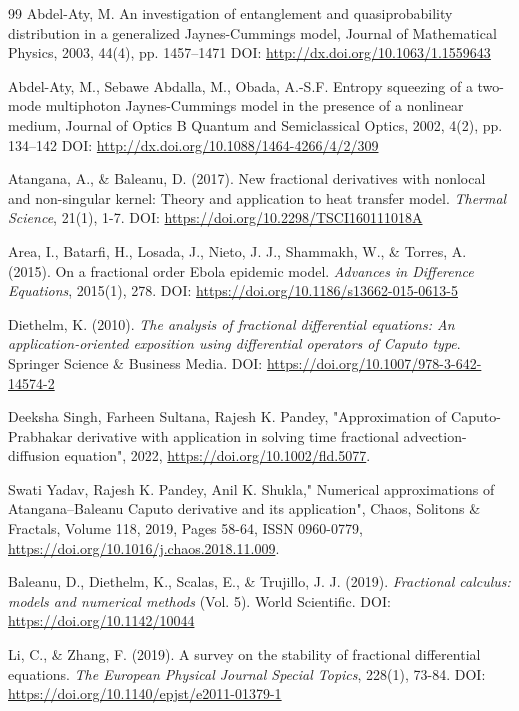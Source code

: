 \documentclass[10pt]{NSP1}
\begin{document}
\begin{thebibliography}{99}
 Abdel-Aty, M.
An investigation of entanglement and quasiprobability distribution in a generalized Jaynes-Cummings model, Journal of Mathematical Physics, 2003, 44(4), pp. 1457--1471 DOI: \url{http://dx.doi.org/10.1063/1.1559643}

 Abdel-Aty, M., Sebawe Abdalla, M., Obada, A.-S.F.
Entropy squeezing of a two-mode multiphoton Jaynes-Cummings model in the presence of a nonlinear medium, Journal of Optics B Quantum and Semiclassical Optics, 2002, 4(2), pp. 134--142 DOI: \url{http://dx.doi.org/10.1088/1464-4266/4/2/309}

Atangana, A., \& Baleanu, D. (2017). New fractional derivatives with nonlocal and non-singular kernel: Theory and application to heat transfer model. \emph{Thermal Science}, 21(1), 1-7. DOI: \url{https://doi.org/10.2298/TSCI160111018A}

Area, I., Batarfi, H., Losada, J., Nieto, J. J., Shammakh, W., \& Torres, A. (2015). On a fractional order Ebola epidemic model. \emph{Advances in Difference Equations}, 2015(1), 278. DOI: \url{https://doi.org/10.1186/s13662-015-0613-5}

Diethelm, K. (2010). \emph{The analysis of fractional differential equations: An application-oriented exposition using differential operators of Caputo type}. Springer Science \& Business Media. DOI: \url{https://doi.org/10.1007/978-3-642-14574-2}

Deeksha Singh, Farheen Sultana, Rajesh K. Pandey, "Approximation of Caputo-Prabhakar derivative with application in solving time fractional advection-diffusion equation", 2022, \url{https://doi.org/10.1002/fld.5077}.

Swati Yadav, Rajesh K. Pandey, Anil K. Shukla," Numerical approximations of Atangana--Baleanu Caputo derivative and its application", Chaos, Solitons \& Fractals, Volume 118, 2019, Pages 58-64, ISSN 0960-0779, \url{https://doi.org/10.1016/j.chaos.2018.11.009}.

Baleanu, D., Diethelm, K., Scalas, E., \& Trujillo, J. J. (2019). \emph{Fractional calculus: models and numerical methods} (Vol. 5). World Scientific. DOI: \url{https://doi.org/10.1142/10044}

Li, C., \& Zhang, F. (2019). A survey on the stability of fractional differential equations. \emph{The European Physical Journal Special Topics}, 228(1), 73-84. DOI: \url{https://doi.org/10.1140/epjst/e2011-01379-1}


\end{thebibliography}
\end{document}
